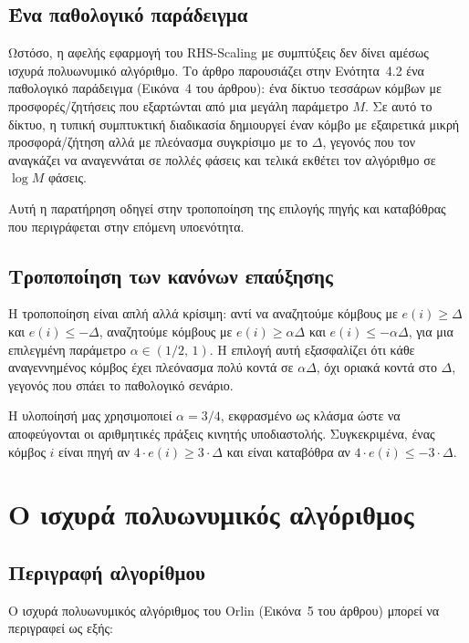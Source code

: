 \documentclass[11pt,a4paper,oneside]{report}
\let\oldsubsection\subsection
\renewcommand{\subsection}{\FloatBarrier\oldsubsection}
\begin{document}
\subsection{Ένα παθολογικό παράδειγμα}

Ωστόσο, η αφελής εφαρμογή του \textenglish{RHS-Scaling} με συμπτύξεις δεν δίνει αμέσως ισχυρά πολυωνυμικό αλγόριθμο. Το άρθρο παρουσιάζει στην Ενότητα~4.2 ένα παθολογικό παράδειγμα (Εικόνα~4 του άρθρου): ένα δίκτυο τεσσάρων κόμβων με προσφορές/ζητήσεις που εξαρτώνται από μια μεγάλη παράμετρο $M$. Σε αυτό το δίκτυο, η τυπική συμπτυκτική διαδικασία δημιουργεί έναν κόμβο με εξαιρετικά μικρή προσφορά/ζήτηση αλλά με πλεόνασμα συγκρίσιμο με το $\Delta$, γεγονός που τον αναγκάζει να αναγεννάται σε πολλές φάσεις και τελικά εκθέτει τον αλγόριθμο σε $\log M$ φάσεις.

Αυτή η παρατήρηση οδηγεί στην τροποποίηση της επιλογής πηγής και καταβόθρας που περιγράφεται στην επόμενη υποενότητα.

\subsection{Τροποποίηση των κανόνων επαύξησης}

Η τροποποίηση είναι απλή αλλά κρίσιμη: αντί να αναζητούμε κόμβους με $e(i) \geq \Delta$ και $e(i) \leq -\Delta$, αναζητούμε κόμβους με $e(i) \geq \alpha\Delta$ και $e(i) \leq -\alpha\Delta$, για μια επιλεγμένη παράμετρο $\alpha \in (1/2,\, 1)$. Η επιλογή αυτή εξασφαλίζει ότι κάθε αναγεννημένος κόμβος έχει πλεόνασμα πολύ κοντά σε $\alpha\Delta$, όχι οριακά κοντά στο $\Delta$, γεγονός που σπάει το παθολογικό σενάριο.

Η υλοποίησή μας χρησιμοποιεί $\alpha = 3/4$, εκφρασμένο ως κλάσμα ώστε να αποφεύγονται οι αριθμητικές πράξεις κινητής υποδιαστολής. Συγκεκριμένα, ένας κόμβος $i$ είναι πηγή αν $4 \cdot e(i) \geq 3 \cdot \Delta$ και είναι καταβόθρα αν $4 \cdot e(i) \leq -3 \cdot \Delta$.

\section{Ο ισχυρά πολυωνυμικός αλγόριθμος}

\subsection{Περιγραφή αλγορίθμου}

Ο ισχυρά πολυωνυμικός αλγόριθμος του \textenglish{Orlin} (Εικόνα~5 του άρθρου) μπορεί να περιγραφεί ως εξής:
\end{document}

